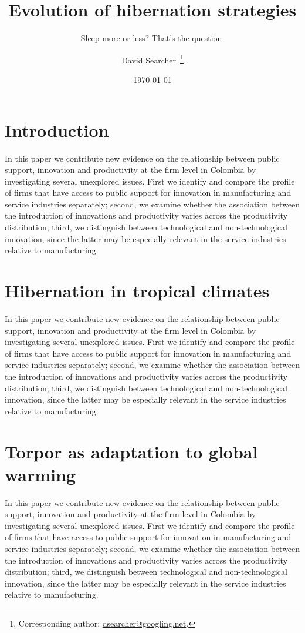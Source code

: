 \title{Evolution of hibernation strategies}
\subtitle{Sleep more or less? That's the question.}
\author{David Searcher\,
\thanks{Corresponding author: \href{mailto:dsearcher@googling.net}{dsearcher@googling.net}.}}
\date{\today}
\maketitle
\section{Introduction}
In this paper we contribute new evidence on the relationship between public support, innovation and productivity at the firm level in Colombia by investigating several unexplored issues. First we identify and compare the profile of firms that have access to public support for innovation in manufacturing and service industries separately; second, we examine whether the association between the introduction of innovations and productivity varies across the productivity distribution; third, we distinguish between technological and non-technological innovation, since the latter may be especially relevant in the service industries relative to manufacturing.
\section{Hibernation in tropical climates}
In this paper we contribute new evidence on the relationship between public support, innovation and productivity at the firm level in Colombia by investigating several unexplored issues. First we identify and compare the profile of firms that have access to public support for innovation in manufacturing and service industries separately; second, we examine whether the association between the introduction of innovations and productivity varies across the productivity distribution; third, we distinguish between technological and non-technological innovation, since the latter may be especially relevant in the service industries relative to manufacturing.
\section{Torpor as adaptation to global warming}
In this paper we contribute new evidence on the relationship between public support, innovation and productivity at the firm level in Colombia by investigating several unexplored issues. First we identify and compare the profile of firms that have access to public support for innovation in manufacturing and service industries separately; second, we examine whether the association between the introduction of innovations and productivity varies across the productivity distribution; third, we distinguish between technological and non-technological innovation, since the latter may be especially relevant in the service industries relative to manufacturing.